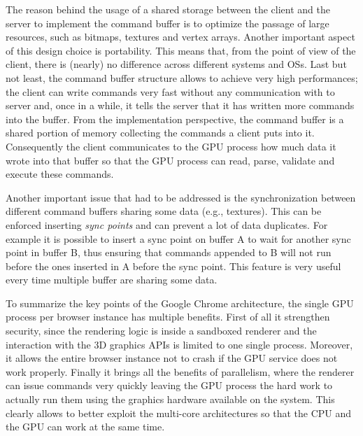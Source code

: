 The reason behind the usage of a shared storage between the client and the server to implement
the command buffer is to optimize the passage of large resources, such as bitmaps,
textures and vertex arrays. Another important aspect of this design choice is
portability. This means that, from the point of view of the client, there is (nearly) no
difference across different systems and OSs. Last but not least, the command buffer
structure allows to achieve very high performances; the client can write commands
very fast without any communication with to server and, once in a while,
it tells the server that it has written more commands into the buffer.
From the implementation perspective, the command buffer is a shared portion of
memory collecting the commands a client puts into it. Consequently the client
communicates to the GPU process how much data it wrote into that buffer so that
the GPU process can read, parse, validate and execute these commands.

Another important issue that had to be addressed is the synchronization between different
command buffers sharing some data (e.g., textures). This can be enforced inserting
\emph{sync points} and can prevent a lot of data duplicates.
For example it is possible to insert a sync point on buffer A
to wait for another sync point in buffer B, thus ensuring that commands appended to
B will not run before the ones inserted in A before the sync point. This feature
is very useful every time multiple buffer are sharing some data.

To summarize the key points of the Google Chrome architecture, the single GPU
process per browser instance has multiple benefits. First of all it strengthen
security, since the rendering logic is inside a sandboxed renderer and the interaction
with the 3D graphics APIs is limited to one single process. Moreover, it allows
the entire browser instance not to crash if the GPU service does not work properly.
Finally it brings all the benefits of parallelism, where the renderer can issue
commands very quickly leaving the GPU process the hard work to actually run them
using the graphics hardware available on the system. This clearly allows to better
exploit the multi-core architectures so that the CPU and the GPU can work at the
same time.
